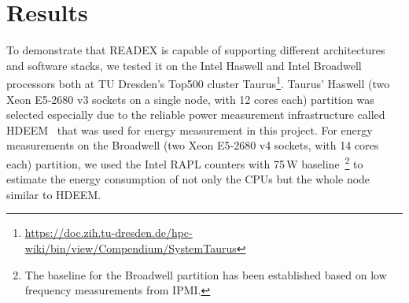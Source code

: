 \section{Results} \label{sec:results}
To demonstrate that READEX is capable of supporting different architectures and software stacks, we tested it on the Intel Haswell and Intel Broadwell processors both at TU Dresden's Top500 cluster Taurus\footnote{\url{https://doc.zih.tu-dresden.de/hpc-wiki/bin/view/Compendium/SystemTaurus}}. Taurus' Haswell (two Xeon E5-2680 v3 sockets on a single node, with 12 cores each) partition was selected especially due to the reliable power measurement infrastructure called HDEEM~\cite{hdeem} that was used for energy measurement in this project. For energy measurements on the Broadwell (two Xeon E5-2680 v4 sockets, with 14 cores each) partition, we used the Intel RAPL counters with 75\,W baseline~\footnote{The baseline for the Broadwell partition has been established based on low frequency measurements from IPMI.} to estimate the energy consumption of not only the CPUs but the whole node similar to HDEEM.

